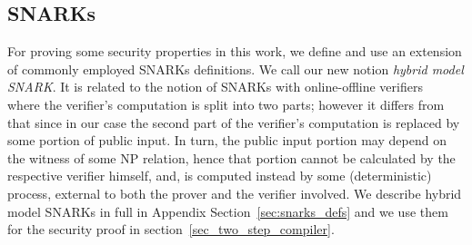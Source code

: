 \subsection{SNARKs}
\label{sec:short_snarks_defs}
\noindent For proving some security properties in this work, we define and use an extension of commonly employed SNARKs definitions. We call our new notion \emph{hybrid model SNARK}. It is related to the notion of SNARKs with online-offline verifiers~\cite{HP_paper} where the verifier's computation 
is split into two parts; however it differs from that since in our case the second part of the verifier's computation is replaced by some portion of public input. 
In turn, the public input portion may depend on the witness of some NP relation, hence that portion cannot be calculated by the respective verifier himself, and, is computed instead by some (deterministic) process, external to both the prover and the verifier involved. We describe hybrid model SNARKs in full in Appendix Section~\ref{sec:snarks_defs} and we use them for the security proof in section~\ref{sec_two_step_compiler}.




